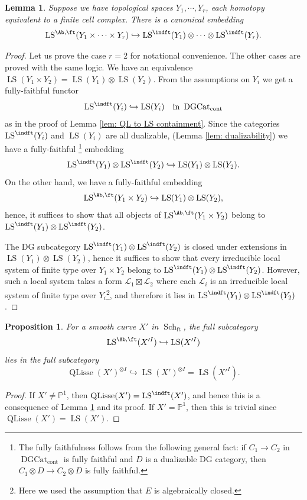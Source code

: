 \documentclass[10pt]{amsart}
\newtheorem{lemma}[subsubsection]{Lemma}
\newtheorem{prop}[subsubsection]{Proposition}
\theoremstyle{remark}
\newcommand{\te}{\text}
\newcommand{\pjl}{\mathbb{P}^1}
\newcommand{\on}{\operatorname}
\newcommand{\cL}{\mathcal{L}}
\newcommand{\DGcat}{\on{DGCat}_{\on{cont}}}
\newcommand{\LS}{\on{LS}}
\newcommand{\QLisse}{\on{QLisse}}
\newcommand{\Schft}{\on{Sch}_{\on{ft}}}
\begin{document}
    \begin{lemma}\label{lem: Ab ft on product into tensor of ind ft}
        Suppose we have topological spaces $Y_1,\cdots,Y_r$, each homotopy equivalent to a finite cell complex. There is a canonical embedding
        \[\LS^{\Ab,\ft}(Y_1\times\cdots\times Y_r)\hookrightarrow \LS^{\indft}(Y_1)\otimes\cdots\otimes \LS^{\indft}(Y_r).\]
    \end{lemma}
    \begin{proof}
        Let us prove the case $r=2$ for notational convenience. The other cases are proved with the same logic.
        We have an equivalence $\LS(Y_1\times Y_2)=\LS(Y_1)\otimes \LS(Y_2)$. From the assumptions on $Y_i$ we get a fully-faithful functor
        \[\LS^{\indft}(Y_i)\hookrightarrow \LS(Y_i)\quad \te{in }\DGcat\]
        as in the proof of Lemma \ref{lem: QL to LS containment}.
        Since the categories $\LS^{\indft}(Y_i)$ and $\LS(Y_i)$ are all dualizable, (Lemma \ref{lem: dualizability}) we have a fully-faithful \footnote{The fully faithfulness follows from the following general fact: if $C_1\rightarrow C_2$ in $\DGcat$ is fully faithful and $D$ is a dualizable DG category, then $C_1\otimes D \rightarrow C_2\otimes D$ is fully faithful.} embedding
        \begin{equation}\label{eq: tensor prod indft into tensor prod LS}
            \LS^{\indft}(Y_1)\otimes \LS^{\indft}(Y_2)\hookrightarrow \LS(Y_1)\otimes \LS(Y_2).
        \end{equation}
        On the other hand, we have a fully-faithful embedding
        \[\LS^{\Ab,\ft}(Y_1\times Y_2)\hookrightarrow \LS(Y_1)\otimes \LS(Y_2),\]
 hence, it suffices to show that all objects of $\LS^{\Ab,\ft}(Y_1\times Y_2)$ belong to $\LS^{\indft}(Y_1)\otimes \LS^{\indft}(Y_2)$.
 \medskip
        
        The DG subcategory $\LS^{\indft}(Y_1)\otimes \LS^{\indft}(Y_2)$ is closed under extensions in $\LS(Y_1)\otimes \LS(Y_2)$, hence it suffices to show that every irreducible local system of finite type over $Y_1\times Y_2$ belong to $\LS^{\indft}(Y_1)\otimes \LS^{\indft}(Y_2)$. However, such a local system takes a form $\cL_1\boxtimes \cL_2$ where each $\cL_i$ is an irreducible local system of finite type over $Y_i$\footnote{Here we used the assumption that $E$ is algebraically closed.},  and therefore it lies in $\LS^{\indft}(Y_1)\otimes \LS^{\indft}(Y_2)$.
    \end{proof}

    \begin{prop}\label{prop: Ab ft I into QLisse tensor}
        For a smooth curve $X'$ in $\Schft$, the full subcategory
        \[\LS^{\Ab,\ft}(X'^I)\hookrightarrow \LS(X'^I)\]
        lies in the full subcategory
        \[\QLisse(X')^{\otimes I}\hookrightarrow \LS(X')^{\otimes I}=\LS(X'^I).\]
    \end{prop}
    \begin{proof}
        If $X'\ne\pjl$, then $\QLisse(X')=\LS^{\indft}(X')$, and hence this is a consequence of Lemma \ref{lem: Ab ft on product into tensor of ind ft} and its proof. If $X'=\pjl$, then this is trivial since $\QLisse(X')=\LS(X')$.
    \end{proof}
\end{document}
